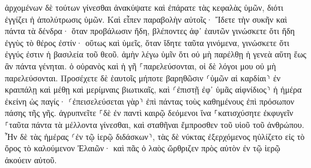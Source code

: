 \documentclass[twoside, 9pt]{extreport}
\begin{document}
ἀρχομένων δὲ τούτων γίνεσθαι ἀνακύψατε καὶ ἐπάρατε τὰς κεφαλὰς ὑμῶν, διότι ἐγγίζει ἡ ἀπολύτρωσις ὑμῶν. 
Καὶ εἶπεν παραβολὴν αὐτοῖς· Ἴδετε τὴν συκῆν καὶ πάντα τὰ δένδρα· 
ὅταν προβάλωσιν ἤδη, βλέποντες ἀφ᾽ ἑαυτῶν γινώσκετε ὅτι ἤδη ἐγγὺς τὸ θέρος ἐστίν· 
οὕτως καὶ ὑμεῖς, ὅταν ἴδητε ταῦτα γινόμενα, γινώσκετε ὅτι ἐγγύς ἐστιν ἡ βασιλεία τοῦ θεοῦ. 
ἀμὴν λέγω ὑμῖν ὅτι οὐ μὴ παρέλθῃ ἡ γενεὰ αὕτη ἕως ἂν πάντα γένηται. 
ὁ οὐρανὸς καὶ ἡ γῆ ⸀παρελεύσονται, οἱ δὲ λόγοι μου οὐ μὴ παρελεύσονται. 
Προσέχετε δὲ ἑαυτοῖς μήποτε βαρηθῶσιν ⸂ὑμῶν αἱ καρδίαι⸃ ἐν κραιπάλῃ καὶ μέθῃ καὶ μερίμναις βιωτικαῖς, καὶ ⸂ἐπιστῇ ἐφ᾽ ὑμᾶς αἰφνίδιος⸃ ἡ ἡμέρα ἐκείνη 
ὡς παγίς· ⸂ἐπεισελεύσεται γὰρ⸃ ἐπὶ πάντας τοὺς καθημένους ἐπὶ πρόσωπον πάσης τῆς γῆς. 
ἀγρυπνεῖτε ⸀δὲ ἐν παντὶ καιρῷ δεόμενοι ἵνα ⸀κατισχύσητε ἐκφυγεῖν ⸀ταῦτα πάντα τὰ μέλλοντα γίνεσθαι, καὶ σταθῆναι ἔμπροσθεν τοῦ υἱοῦ τοῦ ἀνθρώπου. 
Ἦν δὲ τὰς ἡμέρας ⸂ἐν τῷ ἱερῷ διδάσκων⸃, τὰς δὲ νύκτας ἐξερχόμενος ηὐλίζετο εἰς τὸ ὄρος τὸ καλούμενον Ἐλαιῶν· 
καὶ πᾶς ὁ λαὸς ὤρθριζεν πρὸς αὐτὸν ἐν τῷ ἱερῷ ἀκούειν αὐτοῦ. 
\end{document}
